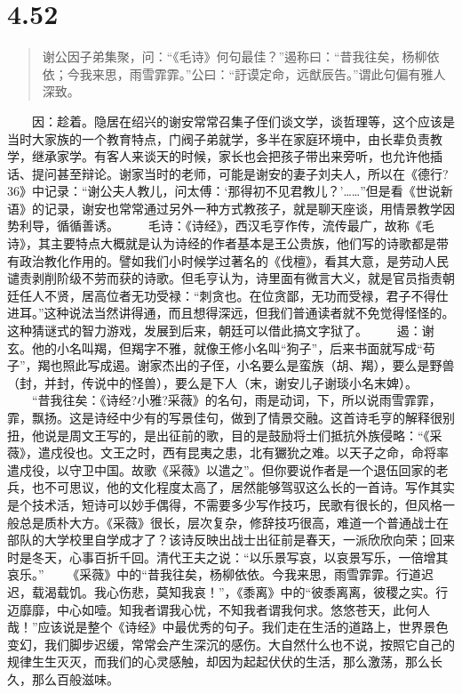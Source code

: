 \documentclass[]{book}
\begin{document}
\section{4.52}\label{section-230}

\begin{quote}
谢公因子弟集聚，问：``《毛诗》何句最佳？''遏称曰：``昔我往矣，杨柳依依；今我来思，雨雪霏霏。''公曰：``訏谟定命，远猷辰告。''谓此句偏有雅人深致。
\end{quote}

　　因：趁着。隐居在绍兴的谢安常常召集子侄们谈文学，谈哲理等，这个应该是当时大家族的一个教育特点，门阀子弟就学，多半在家庭环境中，由长辈负责教学，继承家学。有客人来谈天的时候，家长也会把孩子带出来旁听，也允许他插话、提问甚至辩论。谢家当时的老师，可能是谢安的妻子刘夫人，所以在《德行?36》中记录：``谢公夫人教儿，问太傅：`那得初不见君教儿？'\ldots{}\ldots{}''但是看《世说新语》的记录，谢安也常常通过另外一种方式教孩子，就是聊天座谈，用情景教学因势利导，循循善诱。
　　毛诗：《诗经》，西汉毛亨作传，流传最广，故称《毛诗》，其主要特点大概就是认为诗经的作者基本是王公贵族，他们写的诗歌都是带有政治教化作用的。譬如我们小时候学过著名的《伐檀》，看其大意，是劳动人民谴责剥削阶级不劳而获的诗歌。但毛亨认为，诗里面有微言大义，就是官员指责朝廷任人不贤，居高位者无功受禄：``刺贪也。在位贪鄙，无功而受禄，君子不得仕进耳。''这种说法当然讲得通，而且想得深远，但我们普通读者就不免觉得怪怪的。这种猜谜式的智力游戏，发展到后来，朝廷可以借此搞文字狱了。
　　遏：谢玄。他的小名叫羯，但羯字不雅，就像王修小名叫``狗子''，后来书面就写成``苟子''，羯也照此写成遏。谢家杰出的子侄，小名要么是蛮族（胡、羯），要么是野兽（封，并封，传说中的怪兽），要么是下人（末，谢安儿子谢琰小名末婢）。
　　``昔我往矣：《诗经?小雅?采薇》的名句，雨是动词，下，所以说雨雪霏霏，霏，飘扬。这是诗经中少有的写景佳句，做到了情景交融。这首诗毛亨的解释很别扭，他说是周文王写的，是出征前的歌，目的是鼓励将士们抵抗外族侵略：``《采薇》，遣戍役也。文王之时，西有昆夷之患，北有玁狁之难。以天子之命，命将率遣戍役，以守卫中国。故歌《采薇》以遣之''。但你要说作者是一个退伍回家的老兵，也不可思议，他的文化程度太高了，居然能够驾驭这么长的一首诗。写作其实是个技术活，短诗可以妙手偶得，不需要多少写作技巧，民歌有很长的，但风格一般总是质朴大方。《采薇》很长，层次复杂，修辞技巧很高，难道一个普通战士在部队的大学校里自学成才了？该诗反映出战士出征前是春天，一派欣欣向荣；回来时是冬天，心事百折千回。清代王夫之说：``以乐景写哀，以哀景写乐，一倍增其哀乐。''
　　《采薇》中的``昔我往矣，杨柳依依。今我来思，雨雪霏霏。行道迟迟，载渴载饥。我心伤悲，莫知我哀！''，《黍离》中的``彼黍离离，彼稷之实。行迈靡靡，中心如噎。知我者谓我心忧，不知我者谓我何求。悠悠苍天，此何人哉！''应该说是整个《诗经》中最优秀的句子。我们走在生活的道路上，世界景色变幻，我们脚步迟缓，常常会产生深沉的感伤。大自然什么也不说，按照它自己的规律生生灭灭，而我们的心灵感触，却因为起起伏伏的生活，那么激荡，那么长久，那么百般滋味。
\end{document}
